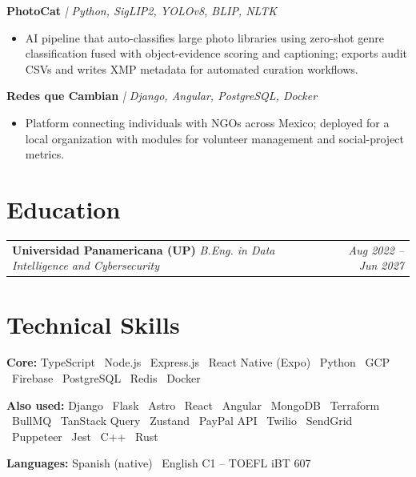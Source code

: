 \documentclass[10pt, letterpaper]{article}
\makeatletter
\newcommand{\entry}[2]{%
  \noindent\begin{tabular*}{\textwidth}{@{}l@{\extracolsep{\fill}}r@{}}
    #1 & #2
  \end{tabular*}}
\newenvironment{cvlist}{%
  \begin{itemize}[leftmargin=1.2em,itemsep=0.5pt,topsep=2pt,parsep=0pt]
}{\end{itemize}}
\makeatother
\begin{document}
\noindent\textbf{PhotoCat} \textit{| Python, SigLIP2, YOLOv8, BLIP, NLTK}
\begin{cvlist}
  \item AI pipeline that auto-classifies large photo libraries using zero-shot genre
        classification fused with object-evidence scoring and captioning; exports
        audit CSVs and writes XMP metadata for automated curation workflows.
\end{cvlist}

\noindent\textbf{Redes que Cambian} \textit{| Django, Angular, PostgreSQL, Docker}
\begin{cvlist}
  \item Platform connecting individuals with NGOs across Mexico; deployed for a local
        organization with modules for volunteer management and social-project metrics.
\end{cvlist}

\section{Education}

\entry{\textbf{Universidad Panamericana (UP)} \quad
       \textit{B.Eng. in Data Intelligence and Cybersecurity}}%
      {\textit{Aug 2022 -- Jun 2027}}

\section{Technical Skills}

\textbf{Core:} TypeScript \textbullet\ Node.js \textbullet\ Express.js \textbullet\
React Native (Expo) \textbullet\ Python \textbullet\ GCP \textbullet\
Firebase \textbullet\ PostgreSQL \textbullet\ Redis \textbullet\ Docker

\textbf{Also used:} Django \textbullet\ Flask \textbullet\ Astro \textbullet\
React \textbullet\ Angular \textbullet\ MongoDB \textbullet\ Terraform \textbullet\
BullMQ \textbullet\ TanStack Query \textbullet\ Zustand \textbullet\ PayPal API
\textbullet\ Twilio \textbullet\ SendGrid \textbullet\ Puppeteer \textbullet\
Jest \textbullet\ C++ \textbullet\ Rust

\textbf{Languages:} Spanish (native) \textbullet\ English C1 -- TOEFL iBT 607
\end{document}
